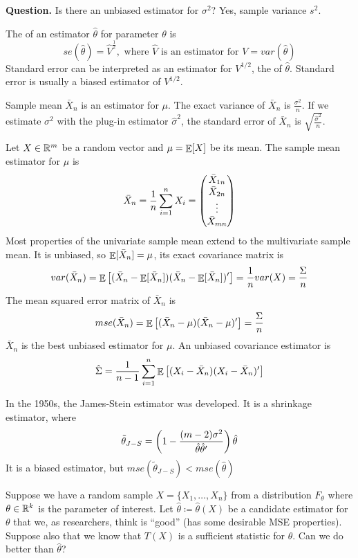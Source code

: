 \documentclass[10pt]{article}
\begin{document}
\textbf{Question.} Is there an unbiased estimator for $\sigma^2$? Yes, sample variance $s^2$.

\begin{definition}
	The  of an estimator $\hat{\theta}$ for parameter $\theta$ is 
	\[
	se(\hat{\theta}) = \hat{V}^{\frac{1}{2}}, \text{ where } \hat{V} \text{ is an estimator for } V = var(\hat{\theta})
	\]
	Standard error can be interpreted as an estimator for $V^{1/2}$, the  of $\hat{\theta}$. Standard error is usually a biased estimator of $V^{1/2}$. 
\end{definition}
\begin{example}
	Sample mean $\bar{X}_n$ is an estimator for $\mu$. The exact variance of $\bar{X}_n$ is $\frac{\sigma^2}{n}$. If we estimate $\sigma^2$ with the plug-in estimator $\hat{\sigma}^2$, the standard error of $\bar{X}_n$ is $\sqrt{\frac{\hat{\sigma}^2}{n}}$. 
\end{example}


Let $X \in \mathbb{R}^m$ be a random vector and $\mu = \mathop{\mathbb{E}}[X]$ be its mean. The sample mean estimator for $\mu$ is 
\[
\bar{X}_n = \frac{1}{n} \sum_{i=1}^n X_i = \begin{pmatrix}\bar{X}_{1n} \\ \bar{X}_{2n} \\ \vdots \\ \bar{X}_{mn}\end{pmatrix}
\]
Most properties of the univariate sample mean extend to the multivariate sample mean. It is unbiased, so $\mathop{\mathbb{E}}[\bar{X}_n] = \mu$, its exact covariance matrix is
\[
var(\bar{X}_n) = \mathop{\mathbb{E}}\left[ (\bar{X}_n - \mathop{\mathbb{E}}[\bar{X}_n])(\bar{X}_n - \mathop{\mathbb{E}}[\bar{X}_n])' \right] = \frac{1}{n} var(X) = \frac{\Sigma}{n}
\]
The mean squared error matrix of $\bar{X}_n$ is 
\[
mse(\bar{X}_n) = \mathop{\mathbb{E}}\left[ (\bar{X}_n - \mu) (\bar{X}_n - \mu)'\right] = \frac{\Sigma}{n}
\]
$\bar{X}_n$ is the best unbiased estimator for $\mu$. An unbiased covariance estimator is
\[
\hat{\Sigma} = \frac{1}{n-1} \sum_{i=1}^n \mathop{\mathbb{E}} \left[ (X_i - \bar{X}_n)(X_i - \bar{X}_n)' \right]
\]



In the 1950s, the James-Stein estimator was developed. It is a shrinkage estimator, where 
\[
\tilde{\theta}_{J-S} = \left( 1 - \frac{(m-2)\sigma^2}{\hat{\theta}\hat{\theta}'} \right)\hat{\theta}
\]
It is a biased estimator, but $mse(\tilde{\theta}_{J-S}) < mse(\hat{\theta})$

Suppose we have a random sample $X = \{X_1,\dots,X_n\}$ from a distribution $F_\theta$ where $\theta \in \mathbb{R}^k$ is the parameter of interest. Let $\hat{\theta} \coloneqq \hat{\theta}(X)$ be a candidate estimator for $\theta$ that we, as researchers, think is ``good'' (\ie has some desirable MSE properties). Suppose also that we know that $T(X)$ is a sufficient statistic for $\theta$. Can we do better than $\hat{\theta}$?
\end{document}
